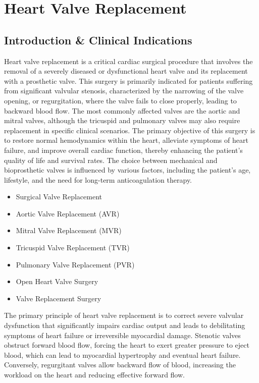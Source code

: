 \chapter{Heart Valve Replacement}

\section*{Introduction \& Clinical Indications}
Heart valve replacement is a critical cardiac surgical procedure that involves the removal of a severely diseased or dysfunctional heart valve and its replacement with a prosthetic valve. This surgery is primarily indicated for patients suffering from significant valvular stenosis, characterized by the narrowing of the valve opening, or regurgitation, where the valve fails to close properly, leading to backward blood flow. The most commonly affected valves are the aortic and mitral valves, although the tricuspid and pulmonary valves may also require replacement in specific clinical scenarios. The primary objective of this surgery is to restore normal hemodynamics within the heart, alleviate symptoms of heart failure, and improve overall cardiac function, thereby enhancing the patient's quality of life and survival rates. The choice between mechanical and bioprosthetic valves is influenced by various factors, including the patient's age, lifestyle, and the need for long-term anticoagulation therapy.

\begin{itemize}
  \item Surgical Valve Replacement
  \item Aortic Valve Replacement (AVR)
  \item Mitral Valve Replacement (MVR)
  \item Tricuspid Valve Replacement (TVR)
  \item Pulmonary Valve Replacement (PVR)
  \item Open Heart Valve Surgery
  \item Valve Replacement Surgery
\end{itemize}

The primary principle of heart valve replacement is to correct severe valvular dysfunction that significantly impairs cardiac output and leads to debilitating symptoms of heart failure or irreversible myocardial damage. Stenotic valves obstruct forward blood flow, forcing the heart to exert greater pressure to eject blood, which can lead to myocardial hypertrophy and eventual heart failure. Conversely, regurgitant valves allow backward flow of blood, increasing the workload on the heart and reducing effective forward flow.

